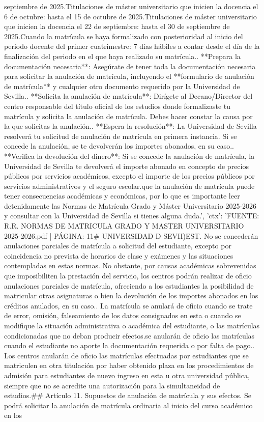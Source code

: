 \documentclass{article}
\begin{document}
\begin{itemize}
{{{septiembre de 2025.\n * Titulaciones de máster universitario que inicien la docencia el 6 de octubre: hasta el 15 de octubre de 2025.\n * Titulaciones de máster universitario que inicien la docencia el 22 de septiembre: hasta el 30 de septiembre de 2025.\n * Cuando la matrícula se haya formalizado con posterioridad al inicio del periodo docente del primer cuatrimestre: 7 días hábiles a contar desde el día de la finalización del periodo en el que haya realizado su matrícula.. **Prepara la documentación necesaria**: Asegúrate de tener toda la documentación necesaria para solicitar la anulación de matrícula, incluyendo el **formulario de anulación de matrícula** y cualquier otro documento requerido por la Universidad de Sevilla.. **Solicita la anulación de matrícula**: Dirígete al Decano/Director del centro responsable del título oficial de los estudios donde formalizaste tu matrícula y solicita la anulación de matrícula. Debes hacer constar la causa por la que solicitas la anulación.. **Espera la resolución**: La Universidad de Sevilla resolverá tu solicitud de anulación de matrícula en primera instancia. Si se concede la anulación, se te devolverán los importes abonados, en su caso.. **Verifica la devolución del dinero**: Si se concede la anulación de matrícula, la Universidad de Sevilla te devolverá el importe abonado en concepto de precios públicos por servicios académicos, excepto el importe de los precios públicos por servicios administrativos y el seguro escolar.\n\nRecuerda que la anulación de matrícula puede tener consecuencias académicas y económicas, por lo que es importante leer detenidamente las Normas de Matrícula Grado y Máster Universitario 2025-2026 y consultar con la Universidad de Sevilla si tienes alguna duda.', 'ctx': 'FUENTE: R.R. NORMAS DE MATRICULA GRADO Y MASTER UNIVERSITARIO 2025-2026.pdf | PÁGINA: 11\n# UNIVERSIDAD D SEVII\n\nC)EST\n{}. No se concederán anulaciones parciales de matrícula a solicitud del estudiante, excepto por coincidencia no prevista de horarios de clase y exámenes y las situaciones contempladas en estas normas. No obstante, por causas académicas sobrevenidas que imposibiliten la prestación del servicio, los centros podrán realizar de oficio anulaciones parciales de matrícula, ofreciendo a los estudiantes la posibilidad de matricular otras asignaturas o bien la devolución de los importes abonados en los créditos anulados, en su caso.\n{}. La matrícula se anulará de oficio cuando se trate de error, omisión, falseamiento de los datos consignados en esta o cuando se modifique la situación administrativa o académica del estudiante, o las matrículas condicionadas que no deban producir efectos.\n\nAsimismo se anularán de oficio las matrículas cuando el estudiante no aporte la documentación requerida o por falta de pago.\n{}. Los centros anularán de oficio las matrículas efectuadas por estudiantes que se matriculen en otra titulación por haber obtenido plaza en los procedimientos de admisión para estudiantes de nuevo ingreso en esta u otra universidad pública, siempre que no se acredite una autorización para la simultaneidad de estudios.\n\n## Artículo 11. Supuestos de anulación de matrícula y sus efectos\n{}. Se podrá solicitar la anulación de matrícula ordinaria al inicio del curso académico en los }}}
\end{itemize}
\end{document}
